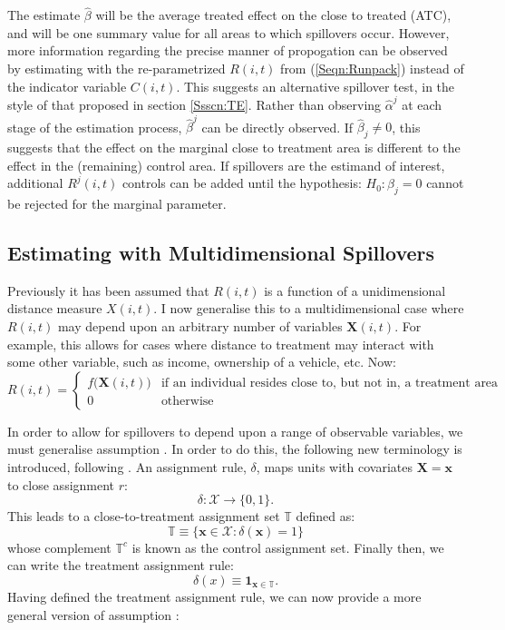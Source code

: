 The estimate $\hat\beta$ will be the average treated effect on the close to 
treated (ATC), and will be one summary value for all areas to which spillovers 
occur. However, more information regarding the precise manner of propogation can 
be observed by estimating with the re-parametrized $R(i,t)$ from 
(\ref{Seqn:Runpack}) instead of the indicator variable $C(i,t)$. This suggests 
an alternative spillover test, in the style of that proposed in section 
\ref{Ssscn:TE}.  Rather than observing $\hat\alpha^j$ at each stage of the 
estimation process, $\hat\beta^j$ can be directly observed. If 
$\hat\beta_j\neq 0$, this suggests that the effect on the marginal close to 
treatment area is different to the effect in the (remaining) control area. If 
spillovers are the estimand of interest, additional $R^j(i,t)$ controls can be 
added until the hypothesis: $H_0: \beta_j = 0$ cannot be rejected for the 
marginal parameter.

\subsection{Estimating with Multidimensional Spillovers}
\label{Ssscn:multi}
Previously it has been assumed that $R(i,t)$ is a function of a unidimensional 
distance measure $X(i,t)$. I now generalise this to a multidimensional case 
where $R(i,t)$ may depend upon an arbitrary number of variables 
$\mathbf{X}(i,t)$. For example, this allows for cases where distance to 
treatment may interact with some other variable, such as income, ownership of 
a vehicle, etc. Now:
\begin{equation}
\nonumber
 R(i,t) =
  \begin{cases}
   f\Big(\mathbf{X}(i,t)\Big)   & \text{if an individual resides close to, but not in, a treatment area} \\
   0                            & \text{otherwise} 
  \end{cases}
\end{equation}

In order to allow for spillovers to depend upon a range of observable variables,
we must generalise assumption .  In order to do this, the
following new terminology is introduced, following \citet{Zajonc2012}. An 
assignment rule, $\delta$, maps units with covariates $\mathbf{X=x}$ to close
assignment $r$:
\[
\delta: \mathcal{X} \rightarrow \{0,1\}.
\]
This leads to a close-to-treatment assignment set $\mathbb{T}$ defined as:
\[
\mathbb{T}\equiv \{ \mathbf{x}\in\mathcal{X}: \delta(\mathbf{x})=1 \}
\]
whose complement $\mathbb{T}^c$ is known as the control assignment
set. Finally then, we can write the treatment assignment rule:
\begin{equation}
\delta(x)\equiv \mathbf{1}_{\mathbf{x}\in\mathbb{T}}.
\end{equation}
Having defined the treatment assignment rule, we can now provide a
more general version of assumption :

